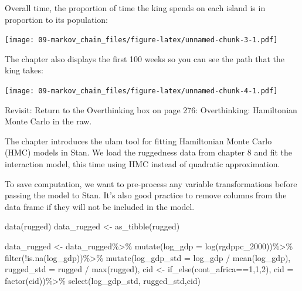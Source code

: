 \documentclass[
]{book}
\newenvironment{Shaded}{\begin{snugshade}}{\end{snugshade}}
\newcommand{\AttributeTok}[1]{\textcolor[rgb]{0.77,0.63,0.00}{#1}}
\newcommand{\DecValTok}[1]{\textcolor[rgb]{0.00,0.00,0.81}{#1}}
\newcommand{\FunctionTok}[1]{\textcolor[rgb]{0.00,0.00,0.00}{#1}}
\newcommand{\NormalTok}[1]{#1}
\newcommand{\OtherTok}[1]{\textcolor[rgb]{0.56,0.35,0.01}{#1}}
\newcommand{\SpecialCharTok}[1]{\textcolor[rgb]{0.00,0.00,0.00}{#1}}
\begin{document}
Overall time, the proportion of time the king spends on each island is in proportion to its population:

\texttt{[image: 09-markov\_chain\_files/figure-latex/unnamed-chunk-3-1.pdf]}

The chapter also displays the first 100 weeks so you can see the path that the king takes:

\texttt{[image: 09-markov\_chain\_files/figure-latex/unnamed-chunk-4-1.pdf]}

Revisit: Return to the Overthinking box on page 276: Overthinking: Hamiltonian Monte Carlo in the raw.

The chapter introduces the ulam tool for fitting Hamiltonian Monte Carlo (HMC) models in Stan. We load the ruggedness data from chapter 8 and fit the interaction model, this time using HMC instead of quadratic approximation.

To save computation, we want to pre-process any variable transformations before passing the model to Stan. It's also good practice to remove columns from the data frame if they will not be included in the model.

\begin{Shaded}
\begin{Highlighting}[]
\FunctionTok{data}\NormalTok{(rugged)}
\NormalTok{data\_rugged }\OtherTok{\textless{}{-}} \FunctionTok{as\_tibble}\NormalTok{(rugged)}

\NormalTok{data\_rugged }\OtherTok{\textless{}{-}}\NormalTok{ data\_rugged}\SpecialCharTok{\%\textgreater{}\%}
  \FunctionTok{mutate}\NormalTok{(}\AttributeTok{log\_gdp =} \FunctionTok{log}\NormalTok{(rgdppc\_2000))}\SpecialCharTok{\%\textgreater{}\%}
  \FunctionTok{filter}\NormalTok{(}\SpecialCharTok{!}\FunctionTok{is.na}\NormalTok{(log\_gdp))}\SpecialCharTok{\%\textgreater{}\%}
  \FunctionTok{mutate}\NormalTok{(}\AttributeTok{log\_gdp\_std =}\NormalTok{ log\_gdp }\SpecialCharTok{/} \FunctionTok{mean}\NormalTok{(log\_gdp),}
         \AttributeTok{rugged\_std =}\NormalTok{ rugged }\SpecialCharTok{/} \FunctionTok{max}\NormalTok{(rugged),}
\NormalTok{         cid }\OtherTok{\textless{}{-}} \FunctionTok{if\_else}\NormalTok{(cont\_africa}\SpecialCharTok{==}\DecValTok{1}\NormalTok{,}\DecValTok{1}\NormalTok{,}\DecValTok{2}\NormalTok{),}
         \AttributeTok{cid =} \FunctionTok{factor}\NormalTok{(cid))}\SpecialCharTok{\%\textgreater{}\%}
  \FunctionTok{select}\NormalTok{(log\_gdp\_std, rugged\_std,cid)}
\end{Highlighting}
\end{Shaded}
\end{document}
